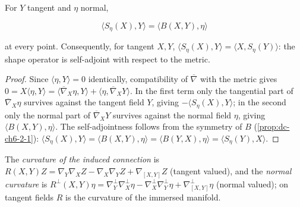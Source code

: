 \begin{lemma}
  \label{lem:dc-ch6-3-weingarten}
  \leanok
  For $Y$ tangent and $\eta$ normal,

  $$
  \langle S_\eta(X),Y\rangle=\langle B(X,Y),\eta\rangle
  $$

  at every point. Consequently, for tangent $X,Y$,
  $\langle S_\eta(X),Y\rangle=\langle X,S_\eta(Y)\rangle$: the shape operator
  is self-adjoint with respect to the metric.
\end{lemma}
\begin{proof}
  \leanok
  Since $\langle\eta,Y\rangle=0$ identically, compatibility of
  $\overline{\nabla}$ with the metric gives
  $0=X\langle\eta,Y\rangle
  =\langle\overline{\nabla}_X\eta,Y\rangle+\langle\eta,\overline{\nabla}_XY\rangle$.
  In the first term only the tangential part of $\overline{\nabla}_X\eta$
  survives against the tangent field $Y$, giving $-\langle S_\eta(X),Y\rangle$;
  in the second only the normal part of $\overline{\nabla}_XY$ survives against
  the normal field $\eta$, giving $\langle B(X,Y),\eta\rangle$. The
  self-adjointness follows from the symmetry of $B$
  (\cref{prop:dc-ch6-2-1}):
  $\langle S_\eta(X),Y\rangle=\langle B(X,Y),\eta\rangle
  =\langle B(Y,X),\eta\rangle=\langle S_\eta(Y),X\rangle$.
\end{proof}

\begin{definition}
  \label{def:dc-ch6-3-curvatures}
  \leanok
  The \emph{curvature of the induced connection} is
  $R(X,Y)Z=\nabla_Y\nabla_XZ-\nabla_X\nabla_YZ+\nabla_{[X,Y]}Z$ (tangent
  valued), and the \emph{normal curvature} is
  $R^\perp(X,Y)\eta=\nabla^\perp_Y\nabla^\perp_X\eta
  -\nabla^\perp_X\nabla^\perp_Y\eta+\nabla^\perp_{[X,Y]}\eta$ (normal valued);
  on tangent fields $R$ is the curvature of the immersed manifold.
\end{definition}

